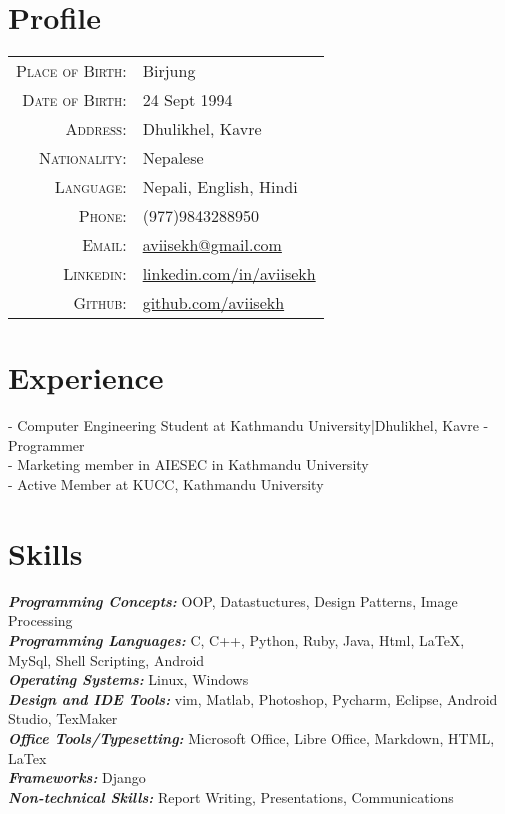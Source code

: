 \documentclass[letter]{res}
\begin{document}
\address{ (977)-9843288950 \\}
\address{
  \texttt{aviisekh@gmail.com}\\ } 
\begin{resume}
  \noindent\makebox[\linewidth]{\rule{\paperwidth}{0.4pt}}

\section{Profile}
\begin{tabular}{rl}
    \textsc{Place of Birth:} & Birjung \\
    \textsc{Date of Birth:} &24 Sept 1994\\
    \textsc{Address:}   & Dhulikhel, Kavre \\
    \textsc{Nationality:} & Nepalese\\
    \textsc{Language:} & Nepali, English, Hindi\\
    \textsc{Phone:}     & (977)9843288950\\
    \textsc{Email:}     & \href{mailto:aviisekh@gmail.com}{aviisekh@gmail.com}\\
    \textsc{Linkedin:} & \href{https://www.linkedin.com/in/aviisekh}{linkedin.com/in/aviisekh}\\
    \textsc{Github:} & \href{https://www.github.com/aviisekh}{github.com/aviisekh}\\
\end{tabular}


  


\section{Experience}
 - {Computer Engineering Student at Kathmandu University|Dhulikhel, Kavre} \newline
 - {Programmer} \\
 - {Marketing member in AIESEC in Kathmandu University}\\
 - {Active Member at KUCC, Kathmandu University} 
 
\section{Skills}
{\sl \textbf{Programming Concepts:}}  OOP, Datastuctures, Design Patterns, Image Processing\\
{\sl \textbf{Programming Languages:}}  C, C++, Python, Ruby, Java, Html, \LaTeX, MySql, Shell Scripting, Android\\
{\sl \textbf{Operating Systems:}} Linux, Windows \\ 
{\sl \textbf{Design and IDE Tools:}} vim, Matlab, Photoshop, Pycharm, Eclipse, Android Studio, TexMaker \\ 
{\sl \textbf{Office Tools/Typesetting:}} Microsoft Office, Libre Office, Markdown, HTML, LaTex\\
{\sl \textbf{Frameworks:}} Django\\
{\sl \textbf{Non-technical Skills:}} Report Writing, Presentations, Communications



\end{resume}
\end{document}
